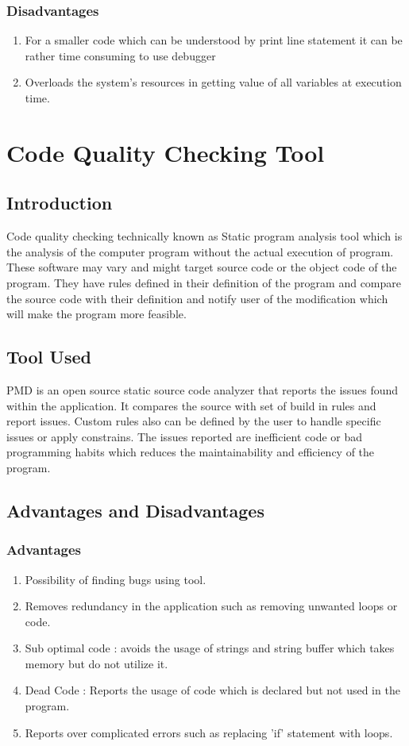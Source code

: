 \documentclass[a4paper, 11pt]{article}
\begin{document}
\subsubsection{Disadvantages}
\begin{enumerate}
    \item For a smaller code which can be understood by print line statement it can be rather time consuming to use debugger
    \item Overloads the system's resources in getting value of all variables at execution time.
\end{enumerate}


\newpage
\section{Code Quality Checking Tool }
\subsection{Introduction}
Code quality checking technically known as Static program analysis tool which is the analysis of the computer program without the actual execution of program. These software may vary and might target source code or the object code of the program. They have rules defined in their definition of the program and compare the source code with their definition and notify user of the modification which will make the program more feasible.\cite{wikiStatic}
\subsection{Tool Used}
PMD is an open source static source code analyzer that reports the issues found within the application. It compares the source with set of build in rules and report issues. Custom rules also can be defined by the user to handle specific issues or apply constrains. The issues reported are inefficient code or bad programming habits which reduces the maintainability and efficiency of the program. \cite{wikiPMD}
\subsection{Advantages and Disadvantages}
\subsubsection{Advantages}
\begin{enumerate}
    \item Possibility of finding bugs using tool.
    \item Removes redundancy in the application such as removing unwanted loops or code.
    \item Sub optimal code : avoids the usage of strings and string buffer which takes memory but do not utilize it. 
    \item Dead Code : Reports the usage of code which is declared but not used in the program.
    \item Reports over complicated errors such as replacing 'if' statement with loops.
\end{enumerate}
\end{document}
